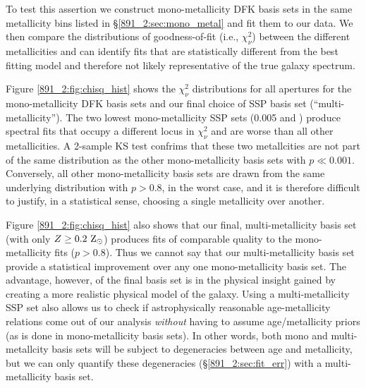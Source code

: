 To test this assertion we construct mono-metallicity DFK basis sets in
the same metallicity bins listed in \S\ref{891_2:sec:mono_metal} and fit
them to our data. We then compare the distributions of goodness-of-fit
(i.e., $\chi^2_\nu$) between the different metallicities and can
identify fits that are statistically different from the best fitting
model and therefore not likely representative of the true galaxy
spectrum.

Figure \ref{891_2:fig:chisq_hist} shows the $\chi^2_\nu$ distributions for
all \GP apertures for the mono-metallicity DFK basis sets and our
final choice of SSP basis set (``multi-metallicity''). The two lowest
mono-metallicity SSP sets (0.005 and ) produce
spectral fits that occupy a different locus in $\chi^2_\nu$ and are
worse than all other metallicities. A 2-sample KS test confrims that
these two metallcities are not part of the same distribution as the
other mono-metallicity basis sets with $p \ll 0.001$. Conversely, all
other mono-metallicity basis sets are drawn from the same underlying
distribution with $p > 0.8$, in the worst case, and it is therefore
difficult to justify, in a statistical sense, choosing a single
metallicity over another. 

Figure \ref{891_2:fig:chisq_hist} also shows that our final,
multi-metallicity basis set (with only $Z \geq 0.2~\mathrm{\mathrm{Z}_{\odot}} $)
produces fits of comparable quality to the mono-metallicity fits ($p >
0.8$). Thus we cannot say that our multi-metallicity basis set provide
a statistical improvement over any one mono-metallicity basis set. The
advantage, however, of the final basis set is in the physical insight
gained by creating a more realistic physical model of the
galaxy. Using a multi-metallicity SSP set also allows us to check if
astrophysically reasonable age-metallicity relations come out of our
analysis \emph{without} having to assume age/metallicity priors (as is
done in mono-metallicity basis sets). In other words, both mono and
multi-metallcity basis sets will be subject to degeneracies between
age and metallicity, but we can only quantify these degeneracies
(\S\ref{891_2:sec:fit_err}) with a multi-metallicity basis set.


